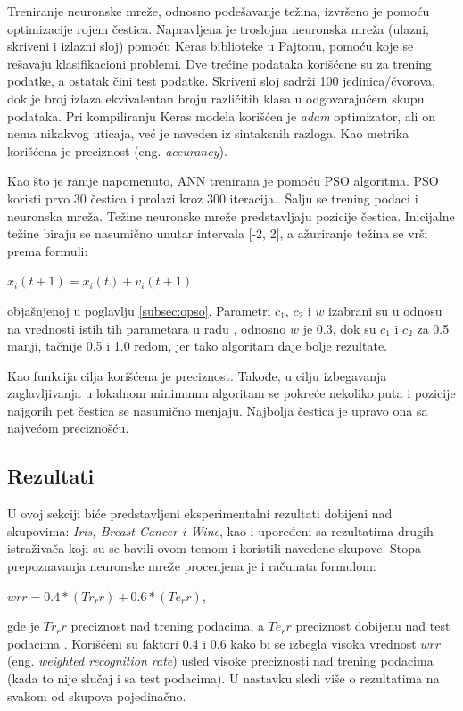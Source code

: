 \documentclass[a4paper]{article}
\begin{document}
Treniranje neuronske mreže, odnosno podešavanje težina, izvršeno je pomoću optimizacije rojem čestica. 
Napravljena je troslojna neuronska mreža (ulazni, skriveni i izlazni sloj) pomoću Keras biblioteke u Pajtonu, pomoću koje se rešavaju klasifikacioni problemi. 
Dve trećine podataka korišćene su za trening podatke, a ostatak čini test podatke. Skriveni sloj sadrži 100 jedinica/čvorova, dok je broj izlaza 
ekvivalentan broju različitih klasa u odgovarajućem skupu podataka. Pri kompiliranju Keras modela korišćen je \textit{adam} optimizator,
ali on nema nikakvog uticaja, već je naveden iz sintaksnih razloga. Kao metrika korišćena je preciznost (eng. \emph{accurancy}). 

Kao što je ranije napomenuto, ANN trenirana je pomoću PSO algoritma. PSO koristi prvo 30 čestica i prolazi kroz 300 iteracija.. 
Šalju se trening podaci i neuronska mreža. Težine neuronske mreže predstavljaju pozicije čestica. Inicijalne težine biraju se 
nasumično unutar intervala [-2, 2], a ažuriranje težina se vrši prema formuli: 

\begin{center}
{$x_i(t+1) = x_i(t) + v_i(t+1)$}
\end{center}
objašnjenoj u poglavlju \ref{subsec:opso}. Parametri $c_1$, $c_2$ i $w$ izabrani su u odnosu na vrednosti istih tih parametara u radu \cite{hindawi},
odnosno $w$ je 0.3, dok su $c_1$ i $c_2$ za 0.5 manji, tačnije 0.5 i 1.0 redom, jer tako algoritam daje bolje rezultate. 

Kao funkcija cilja korišćena je preciznost. Takođe, u cilju izbegavanja zaglavljivanja u lokalnom minimumu algoritam se pokreće 
nekoliko puta i pozicije najgorih pet čestica se nasumično menjaju. Najbolja čestica je upravo ona sa najvećom preciznošću.

\subsection{Rezultati}
\label{rezultati}

U ovoj sekciji biće predstavljeni eksperimentalni rezultati dobijeni nad skupovima: \textit{Iris, Breast Cancer i Wine}, kao i upoređeni sa
rezultatima drugih istraživača koji su se bavili ovom temom i koristili navedene skupove. Stopa prepoznavanja neuronske
mreže procenjena je i računata formulom:

\begin{center}
{$wrr = 0.4*(Tr_r r) + 0.6*(Te_r r)$}, 
\end{center}
gde je $Tr_r r$ preciznost nad trening podacima, a $Te_r r$ preciznost dobijenu nad test podacima \cite{hindawi}. 
Korišćeni su faktori 0.4 i 0.6 kako bi se izbegla visoka vrednost $wrr$ (eng. \emph{weighted recognition rate}) 
usled visoke preciznosti nad trening podacima  (kada to nije slučaj i sa test podacima). U nastavku sledi više o rezultatima 
na svakom od skupova pojedinačno.
\end{document}
